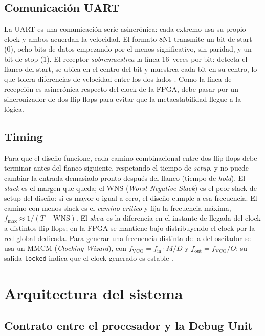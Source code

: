 \documentclass[12pt,a4paper]{article}
\begin{document}
\subsection{Comunicación UART}

La UART es una comunicación serie asincrónica: cada extremo usa su propio
clock y ambos acuerdan la velocidad. El formato 8N1 transmite un bit de start
(0), ocho bits de datos empezando por el menos significativo, sin paridad, y un
bit de stop (1). El receptor \emph{sobremuestrea} la línea 16~veces por bit:
detecta el flanco del start, se ubica en el centro del bit y muestrea cada bit
en su centro, lo que tolera diferencias de velocidad entre los dos lados
\cite{chu}. Como la línea de recepción es asincrónica respecto del clock de la
FPGA, debe pasar por un sincronizador de dos flip-flops para evitar que la
metaestabilidad llegue a la lógica.

\subsection{Timing}

Para que el diseño funcione, cada camino combinacional entre dos flip-flops debe
terminar antes del flanco siguiente, respetando el tiempo de \emph{setup}, y no
puede cambiar la entrada demasiado pronto después del flanco (tiempo de
\emph{hold}). El \emph{slack} es el margen que queda; el WNS (\emph{Worst
Negative Slack}) es el peor slack de setup del diseño: si es mayor o igual a
cero, el diseño cumple a esa frecuencia. El camino con menos slack es el
\emph{camino crítico} y fija la frecuencia máxima,
$f_{\max} \approx 1/(T - \text{WNS})$. El \emph{skew} es la diferencia en el
instante de llegada del clock a distintos flip-flops; en la FPGA se mantiene
bajo distribuyendo el clock por la red global dedicada. Para generar una
frecuencia distinta de la del oscilador se usa un MMCM (\emph{Clocking
Wizard}), con $f_{\text{VCO}} = f_{\text{in}} \cdot M / D$ y
$f_{\text{out}} = f_{\text{VCO}} / O$; su salida \texttt{locked} indica que el
clock generado es estable \cite{ug472,pg065}.

\section{Arquitectura del sistema}

\subsection{Contrato entre el procesador y la Debug Unit}
\end{document}
